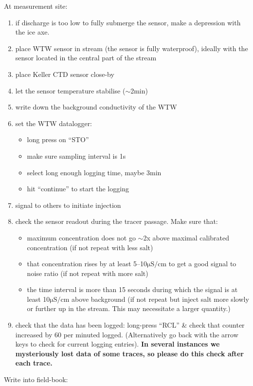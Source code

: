 \documentclass[DIV=15,halfparskip,11pt,headinclude]{scrartcl}
\begin{document}
At measurement site:
\begin{enumerate}
\item if discharge is too low to fully submerge the sensor, make a
depression with the ice axe.
\item place WTW sensor in stream (the sensor is fully waterproof),
  ideally with the sensor located in the central part of the stream
\item place Keller CTD sensor close-by
\item let the sensor temperature stabilise ($\sim$2min)
\item write down the background conductivity of the WTW
\item set the WTW datalogger:
\begin{itemize}
\item long press on ``STO''
\item make sure sampling interval is 1s
\item select long enough logging time, maybe 3min
\item hit ``continue'' to start the logging
\end{itemize}
\item signal to others to initiate injection
\item check the sensor readout during the tracer passage.  Make sure
  that:
\begin{itemize}
\item maximum concentration does not go $\sim$2x above maximal
  calibrated concentration (if not repeat with less salt)
\item that concentration rises by at least 5--10$\mathrm{\mu S/cm}$ to get
  a good signal to noise ratio (if not repeat with more salt)
\item the time interval is more than 15 seconds during which the
  signal is at least 10$\mathrm{\mu S/cm}$ above background (if not
  repeat but inject salt more slowly or further up in the stream.
  This may necessitate a larger quantity.)
\end{itemize}
\item check that the data has been logged: long-press ``RCL'' \& check
  that counter increased by 60 per minuted logged. (Alternatively go
  back with the arrow keys to check for current logging entries).
  \textbf{In several instances we mysteriously lost data of some
    traces, so please do this check after each trace.}
\end{enumerate}


Write into field-book:
\end{document}

